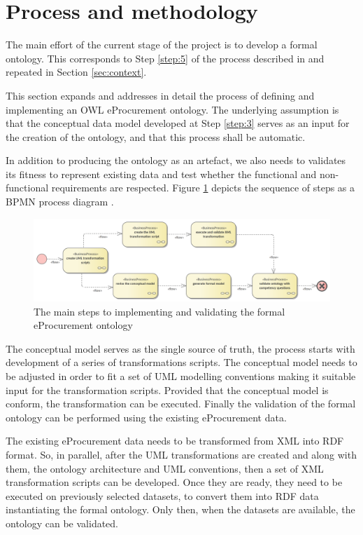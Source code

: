 \section{Process and methodology}
\label{sec:process-approach}
	
	The main effort of the current stage of the project is to develop a formal ontology. This corresponds to Step \ref{step:5} of the process described in \cite[3--15]{d2.01-2017} and repeated in Section \ref{sec:context}.	
	
	This section expands and addresses in detail the process of defining and implementing an OWL eProcurement ontology. The underlying assumption is that the conceptual data model developed at Step \ref{step:3} serves as an input for the creation of the ontology, and that this process shall be automatic. 
	
	In addition to producing the ontology as an artefact, we also needs to validates its fitness to represent existing data and test whether the functional and non-functional requirements are respected. Figure \ref{fig:process-overview} depicts the sequence of steps as a BPMN process diagram \cite{bpmn-introduction}. 
	
	\begin{figure}[!ht]		
		\centering
		\includegraphics[width=\textwidth]{../img/processOverview.png}
		\caption{The main steps to implementing and validating the formal eProcurement ontology}
		\label{fig:process-overview}
	\end{figure}

	The conceptual model serves as the single source of truth, the process starts with development of a series of transformations scripts. The conceptual model needs to be adjusted in order to fit a set of UML modelling conventions \citep{costetchi2020b} making it suitable input for the transformation scripts. Provided that the conceptual model is conform, the transformation can be executed. Finally the validation of the formal ontology can be performed using the existing eProcurement data.
	
	
	The existing eProcurement data needs to be transformed from XML into RDF format. So, in parallel, after the UML transformations are created and along with them, the ontology architecture and UML conventions, then a set of XML transformation scripts can be developed. Once they are ready, they need to be executed on previously selected datasets, to convert them into RDF data instantiating the formal ontology. Only then, when the datasets are available, the ontology can be validated. 
	
